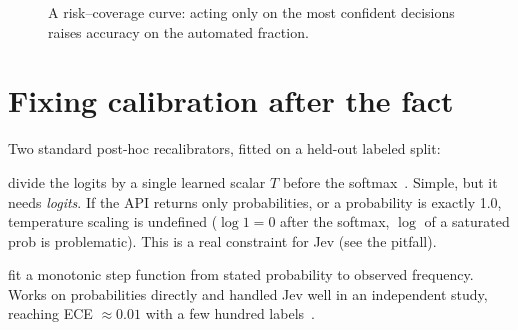 \begin{figure}[h]\centering
{}
\caption{A risk--coverage curve: acting only on the most confident decisions raises
accuracy on the automated fraction.}
\label{fig:riskcov}
\end{figure}

\section{Fixing calibration after the fact}

Two standard post-hoc recalibrators, fitted on a held-out labeled split:

\begin{description}[leftmargin=1.4cm,style=nextline]
  \item[Temperature scaling] divide the logits by a single learned scalar $T$ before the
    softmax~\citep{guo_calibration}. Simple, but it needs \emph{logits}. If the API returns
    only probabilities, or a probability is exactly 1.0, temperature scaling is undefined
    (\(\log 1 = 0\) after the softmax, \(\log\) of a saturated prob is problematic). This is
    a real constraint for Jev (see the pitfall).
  \item[Isotonic regression] fit a monotonic step function from stated probability to
    observed frequency. Works on probabilities directly and handled Jev well in an
    independent study, reaching ECE $\approx 0.01$ with a few hundred labels~\citep{jev_calibration_anthus}.
\end{description}

